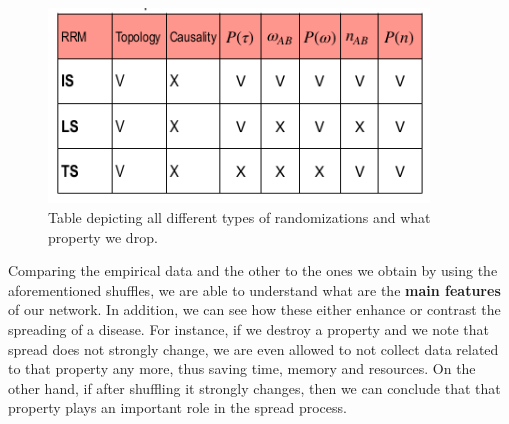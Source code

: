 \documentclass[../main/main.tex]{subfiles}
\begin{document}
\begin{figure}[h!]
\centering
\includegraphics[width=0.9\textwidth]{../lessons/image/17/image14.png}
\caption{\label{fig:17_14} Table depicting all different types of randomizations and what property we drop. }
\end{figure}

Comparing the empirical data and the other to the ones we obtain by using the aforementioned shuffles, we are able to understand what are the \textbf{main features} of our network. In addition, we can see how these either enhance or contrast the spreading of a disease. For instance, if we destroy a property and we note that spread does not strongly change, we are even allowed to not collect data related to that property any more, thus saving time, memory and resources. On the other hand, if after shuffling it strongly changes, then we can conclude that that property plays an important role in the spread process.
\end{document}
